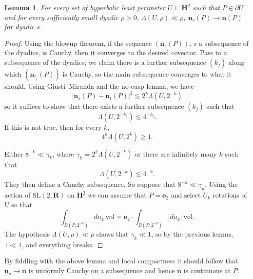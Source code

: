 \documentclass[reqno,12pt,letterpaper]{amsart}
\newcommand{\RR}{\mathbf{R}}
\newcommand{\Hyp}{\mathbf H}
\newcommand{\SL}{\mathrm{SL}}
\newcommand{\evect}{\mathbf e}
\newcommand{\normal}{\mathbf n}
\newcommand{\vol}{\mathrm{vol}}
\newtheorem{lemma}[theorem]{Lemma}
\theoremstyle{definition}
\numberwithin{equation}{section}
\begin{document}
\begin{lemma}
For every set of hyperbolic least perimeter $U \subseteq \Hyp^2$ such that $P \in \partial U$ and for every sufficiently small dyadic $\rho > 0$, $\Lambda(U, \rho) \ll \rho$, $\normal_s(P) \to \normal(P)$ for dyadic $s$.
\end{lemma}
\begin{proof}
Using the blowup theorem, if the sequence $(\normal_s(P))$, $s$ a subsequence of the dyadics, is Cauchy, then it converges to the desired covector.
Pass to a subsequence of the dyadics; we claim there is a further subsequence $(k_j)$ along which $(\normal_{t_j}(P))$ is Cauchy, so the main subsequence converges to what it should.
Using Giusti--Miranda and the no-cusp lemma, we have
$$|\normal_s(P) - \normal_t(P)|^2 \lesssim 2^k \Lambda(U, 2^{-k})$$
so it suffices to show that there exists a further subsequence $(k_j)$ such that
$$\Lambda(U, 2^{-k_j}) \lesssim 4^{-{k_j}}.$$
If this is not true, then for every $k$,
$$4^k \Lambda(U, 2^k) \geq 1.$$

Either $8^{-k} \ll \gamma_k$, where $\gamma_k = 2^k\Lambda(U, 2^{-k})$ or there are infinitely many $k$ such that
$$\Lambda(U, 2^{-k}) \lesssim 4^{-k}.$$
They then define a Cauchy subsequence. So suppose that $8^{-k} \ll \gamma_k$.
Using the action of $\SL(2, \RR)$ on $\Hyp^2$ we can assume that $P = \evect_2$ and select $U_k$ rotations of $U$ so that
$$\int_{B(P, 2^{-k})} du_k ~\vol = \evect_2 \cdot \int_{B(P, 2^{-k})} |du_k| ~\vol.$$
The hypothesis $\Lambda(U, \rho) \ll \rho$ shows that $\gamma_k \ll 1$, so by the previous lemma, $1 \ll 1$, and everything breaks.
\end{proof}

By fiddling with the above lemma and local compactness it should follow that $\normal_s \to \normal$ is uniformly Cauchy on a subsequence and hence $\normal$ is continuous at $P$.



\printbibliography
\end{document}
